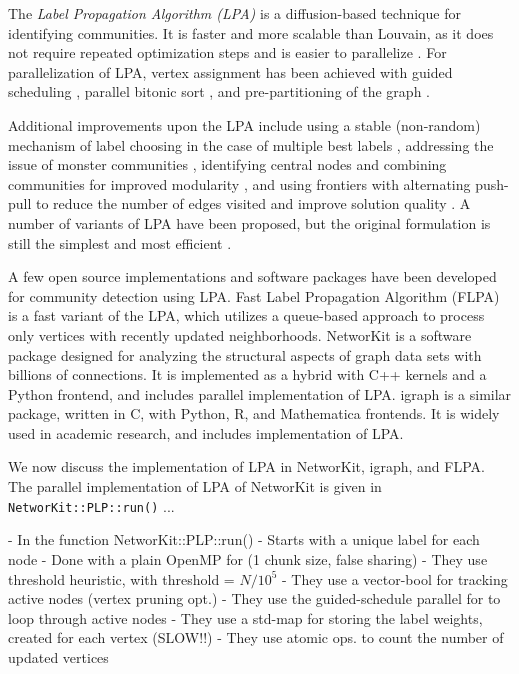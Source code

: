 The \textit{Label Propagation Algorithm (LPA)} is a diffusion-based technique for identifying communities. It is faster and more scalable than Louvain, as it does not require repeated optimization steps and is easier to parallelize \cite{com-newman04, com-raghavan07}. For parallelization of LPA, vertex assignment has been achieved with guided scheduling \cite{staudt2015engineering}, parallel bitonic sort \cite{soman2011fast}, and pre-partitioning of the graph \cite{kuzmin2015parallelizing}.

Additional improvements upon the LPA include using a stable (non-random) mechanism of label choosing in the case of multiple best labels \cite{com-xing14}, addressing the issue of monster communities \cite{com-berahmand18, com-sattari18}, identifying central nodes and combining communities for improved modularity \cite{com-you20}, and using frontiers with alternating push-pull to reduce the number of edges visited and improve solution quality \cite{com-liu20}. A number of variants of LPA have been proposed, but the original formulation is still the simplest and most efficient \cite{garza2019community}.

A few open source implementations and software packages have been developed for community detection using LPA. Fast Label Propagation Algorithm (FLPA) \cite{traag2023large} is a fast variant of the LPA, which utilizes a queue-based approach to process only vertices with recently updated neighborhoods. NetworKit \cite{staudt2016networkit} is a software package designed for analyzing the structural aspects of graph data sets with billions of connections. It is implemented as a hybrid with C++ kernels and a Python frontend, and includes parallel implementation of LPA. igraph \cite{csardi2006igraph} is a similar package, written in C, with Python, R, and Mathematica frontends. It is widely used in academic research, and includes implementation of LPA.

We now discuss the implementation of LPA in NetworKit, igraph, and FLPA. The parallel implementation of LPA of NetworKit is given in \texttt{NetworKit::PLP::run()} ...


- In the function NetworKit::PLP::run()
- Starts with a unique label for each node
- Done with a plain OpenMP for (1 chunk size, false sharing)
- They use threshold heuristic, with threshold = $N/10^5$
- They use a vector-bool for tracking active nodes (vertex pruning opt.)
- They use the guided-schedule parallel for to loop through active nodes
- They use a std-map for storing the label weights, created for each vertex (SLOW!!)
- They use atomic ops. to count the number of updated vertices


